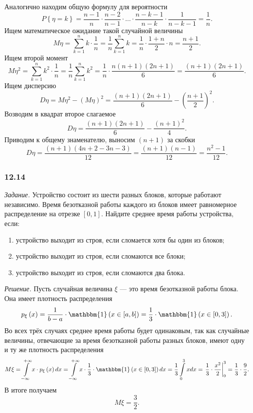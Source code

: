 \begin{enumerate}[label=\alph*)]
Аналогично находим общую формулу для вероятности
$$P \left\{ \eta = k \right\} =
\frac{n-1}{n} \cdot \frac{n-2}{n-1} \cdot \dotsc \cdot \frac{n-k-1}{n-k} \cdot \frac{1}{n-k-1} =
\frac{1}{n}.$$
Ищем математическое ожидание такой случайной величины
$$M \eta =
\sum \limits_{k=1}^n k \cdot \frac{1}{n} =
\frac{1}{n} \sum \limits_{k=1}^n k =
\frac{1}{n} \cdot \frac{1+n}{2} \cdot n =
\frac{n+1}{2}.$$
Ищем второй момент
$$M \eta^2 =
\sum \limits_{k=1}^n k^2 \cdot \frac{1}{n} =
\frac{1}{n} \sum \limits_{k=1}^n k^2 =
\frac{1}{n} \cdot \frac{n \left( n+1 \right) \left( 2n+1 \right) }{6} =
\frac{ \left( n+1 \right) \left( 2n+1 \right) }{6}.$$
Ищем дисперсию
$$D \eta =
M \eta^2 - \left( M \eta \right)^2 =
\frac{ \left( n+1 \right) \left( 2n+1 \right) }{6} - \left( \frac{n+1}{2} \right)^2.$$
Возводим в квадрат второе слагаемое
$$D \eta =
\frac{ \left( n+1 \right) \left( 2n+1 \right) }{6} - \frac{ \left( n+1 \right)^2}{4}.$$
Приводим к общему знаменателю, выносим $ \left( n+1 \right) $ за скобки
$$D \eta =
\frac{ \left( n+1 \right) \left( 4n + 2 - 3n - 3 \right) }{12} =
\frac{ \left( n+1 \right) \left( n-1 \right) }{12} =
\frac{n^2 - 1}{12}.$$
\end{enumerate}

\subsubsection*{12.14}

\textit{Задание.} Устройство состоит из шести разных блоков, которые работают независимо.
Время безотказной работы каждого из блоков имеет равномерное распределение на отрезке $ \left[ 0, 1 \right] $.
Найдите среднее время работы устройства, если:
\begin{enumerate}
\item устройство выходит из строя, если сломается хотя бы один из блоков;
\item устройство выходит из строя, если сломаются все блоки;
\item устройство выходит из строя, если сломаются два блока. 
\end{enumerate}

\textit{Решение.} Пусть случайная величина $ \xi $ --- это время безотказной работы блока.
Она имеет плотность распределения
$$p_{ \xi} \left( x \right) =
\frac{1}{b-a} \cdot \mathbbm{1} \left( x \in \left[ a, b \right] \right) =
\frac{1}{3} \cdot \mathbbm{1} \left( x \in \left[ 0, 3 \right] \right) .$$
Во всех трёх случаях среднее время работы будет одинаковым,
так как случайные величины, отвечающие за время безотказной работы разных блоков, имеют одну и ту же плотность распределения
$$M \xi =
\int \limits_{- \infty }^{+ \infty } x \cdot p_{ \xi } \left( x \right) dx =
\int \limits_{- \infty }^{+ \infty } x \cdot \frac{1}{3} \cdot \mathbbm{1} \left( x \in \left[ 0, 3 \right] \right) dx =
\frac{1}{3} \int \limits_0^3 xdx =
\left. \frac{1}{3} \cdot \frac{x^2}{2} \right|_0^3 =
\frac{1}{3} \cdot \frac{9}{2}.$$
В итоге получаем
$$M \xi =
\frac{3}{2}.$$


